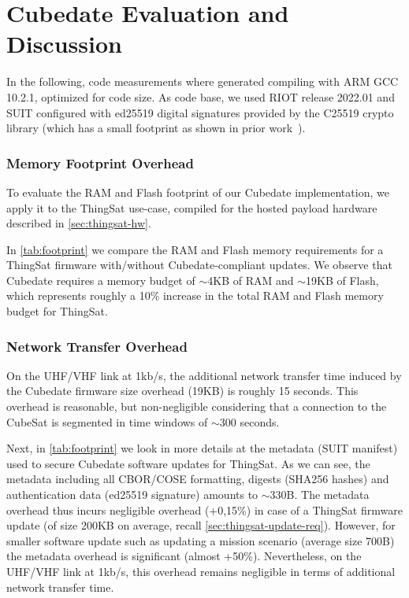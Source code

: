 \section{Cubedate Evaluation and Discussion}
\label{sec:evaluation}

In the following, code measurements where generated compiling with ARM GCC 10.2.1,
optimized for code size. As code base, we used RIOT release 2022.01 and SUIT configured
with ed25519 digital signatures provided by the C25519 crypto library (which has a small
footprint as shown in prior work~\cite{zandberg2019secure}).

\subsubsection{Memory Footprint Overhead}

To evaluate the RAM and Flash footprint of our Cubedate implementation, we apply it to
the ThingSat use-case, compiled for the hosted payload hardware described in \autoref{sec:thingsat-hw}.

In \autoref{tab:footprint} we compare the RAM and Flash memory requirements for a ThingSat firmware with/without Cubedate-compliant updates.
We observe that Cubedate requires a memory budget of $\sim$4KB of RAM and $\sim$19KB of Flash, which represents roughly a 10\%
increase in the total RAM and Flash memory budget for ThingSat.

\subsubsection{Network Transfer Overhead}
On the UHF/VHF link at 1kb/s, the additional network transfer time induced by the Cubedate firmware size overhead (19KB) is roughly 15 seconds.
This overhead is reasonable, but non-negligible considering that a connection to the CubeSat is segmented in time windows of $\sim$300 seconds.

Next, in \autoref{tab:footprint} we look in more details at the metadata (SUIT manifest) used to secure Cubedate software updates for ThingSat.
As we can see, the metadata including all CBOR/COSE formatting, digests (SHA256 hashes) and authentication data (ed25519 signature) amounts to $\sim$330B.
The metadata overhead thus incurs negligible overhead (+0,15\%) in case of a ThingSat firmware update (of size 200KB on average, recall
\autoref{sec:thingsat-update-req}). However, for smaller software update such as updating a mission scenario (average size 700B) the metadata
overhead is significant (almost +50\%). Nevertheless, on the UHF/VHF link at 1kb/s, this overhead remains negligible in terms of additional
network transfer time.


